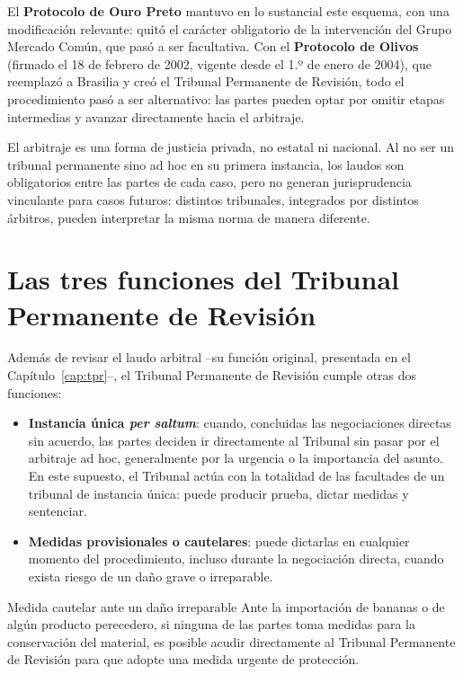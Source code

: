 \documentclass[12pt,oneside]{book}
\begin{document}
El \textbf{Protocolo de Ouro Preto} mantuvo en lo sustancial este esquema, con una modificación relevante: quitó el carácter obligatorio de la intervención del Grupo Mercado Común, que pasó a ser facultativa. Con el \textbf{Protocolo de Olivos} (firmado el 18 de febrero de 2002, vigente desde el 1.º de enero de 2004), que reemplazó a Brasilia y creó el Tribunal Permanente de Revisión, todo el procedimiento pasó a ser alternativo: las partes pueden optar por omitir etapas intermedias y avanzar directamente hacia el arbitraje.

\begin{importante}
El arbitraje es una forma de justicia privada, no estatal ni nacional. Al no ser un tribunal permanente sino ad hoc en su primera instancia, los laudos son obligatorios entre las partes de cada caso, pero no generan jurisprudencia vinculante para casos futuros: distintos tribunales, integrados por distintos árbitros, pueden interpretar la misma norma de manera diferente.
\end{importante}

\section{Las tres funciones del Tribunal Permanente de Revisión}

Además de revisar el laudo arbitral --su función original, presentada en el Capítulo~\ref{cap:tpr}--, el Tribunal Permanente de Revisión cumple otras dos funciones:

\begin{itemize}
    \item \textbf{Instancia única \emph{per saltum}}: cuando, concluidas las negociaciones directas sin acuerdo, las partes deciden ir directamente al Tribunal sin pasar por el arbitraje ad hoc, generalmente por la urgencia o la importancia del asunto. En este supuesto, el Tribunal actúa con la totalidad de las facultades de un tribunal de instancia única: puede producir prueba, dictar medidas y sentenciar.
    \item \textbf{Medidas provisionales o cautelares}: puede dictarlas en cualquier momento del procedimiento, incluso durante la negociación directa, cuando exista riesgo de un daño grave o irreparable.
\end{itemize}

\begin{ejemplo}{Medida cautelar ante un daño irreparable}
Ante la importación de bananas o de algún producto perecedero, si ninguna de las partes toma medidas para la conservación del material, es posible acudir directamente al Tribunal Permanente de Revisión para que adopte una medida urgente de protección.
\end{ejemplo}
\end{document}
